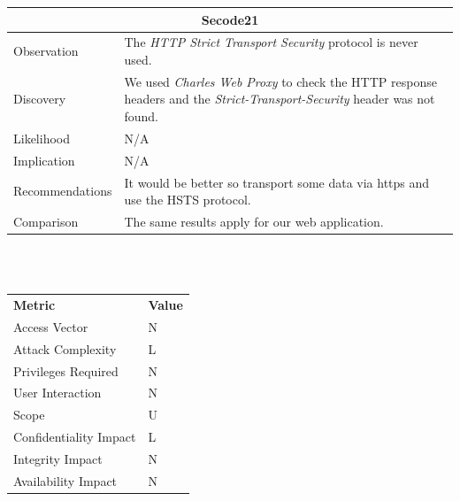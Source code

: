 \documentclass[headsepline,footsepline,footinclude=false,oneside,fontsize=11pt,paper=a4,listof=totoc,bibliography=totoc]{scrbook} %
\begin{document}
\begin{tabular}{ l|p{11cm}  }
	\hline
	\multicolumn{2}{c}{\textbf{Secode21}} \\
	\hline
	Observation   & The \textit{HTTP Strict Transport Security} protocol is never used. \\
	Discovery  & We used \textit{Charles Web Proxy} to check the HTTP response headers and the \textit{Strict-Transport-Security} header was not found. \\
	Likelihood & N/A \\
	Implication    & N/A \\
	Recommendations & It would be better so transport some data via https and use the HSTS protocol. \\
	Comparison& The same results apply for our web application. \\
	\hline
\end{tabular}
\\
\vspace{0.5cm}
\\
\begin{center}
	\begin{tabular}{ll}
		\rowcolor[HTML]{34CDF9}
		{\color[HTML]{ECF4FF} \textbf{Metric}}        & {\color[HTML]{ECF4FF} \textbf{Value}} \\
		\rowcolor[HTML]{BBDAFF}
		{\color[HTML]{333333} Access Vector}          & {\color[HTML]{333333} } N              \\
		\rowcolor[HTML]{ECF4FF}
		{\color[HTML]{333333} Attack Complexity}      & {\color[HTML]{333333} } L              \\
		\rowcolor[HTML]{BBDAFF}
		{\color[HTML]{333333} Privileges Required}    & {\color[HTML]{333333} } N              \\
		\rowcolor[HTML]{ECF4FF}
		{\color[HTML]{333333} User Interaction}       & {\color[HTML]{333333} } N              \\
		\rowcolor[HTML]{BBDAFF}
		{\color[HTML]{333333} Scope}                  & {\color[HTML]{333333} } U              \\
		\rowcolor[HTML]{ECF4FF}
		{\color[HTML]{333333} Confidentiality Impact} & {\color[HTML]{333333} } L              \\
		\rowcolor[HTML]{BBDAFF}
		{\color[HTML]{333333} Integrity Impact}       & {\color[HTML]{333333} } N              \\
		\rowcolor[HTML]{ECF4FF}
		{\color[HTML]{333333} Availability Impact}    & {\color[HTML]{333333} } N
	\end{tabular}
\end{center}
\end{document}
